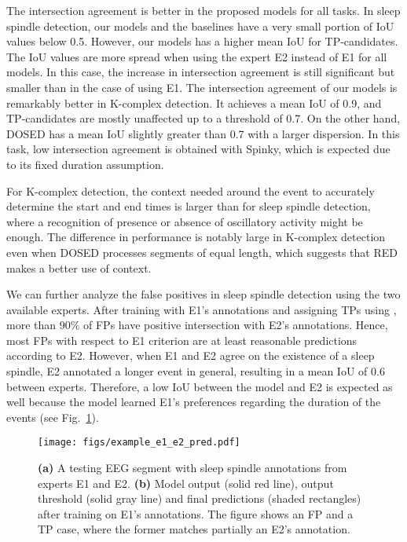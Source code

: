 \documentclass[conference]{IEEEtran}
\begin{document}
The intersection agreement is better in the proposed models for all tasks. In sleep spindle detection, our models and the baselines have a very small portion of IoU values below 0.5. However, our models has a higher mean IoU for TP-candidates. The IoU values are more spread when using the expert E2 instead of E1 for all models. In this case, the increase in intersection agreement is still significant but smaller than in the case of using E1. The intersection agreement of our models is remarkably better in K-complex detection. It achieves a mean IoU of 0.9, and TP-candidates are mostly unaffected up to a threshold of 0.7. On the other hand, DOSED has a mean IoU slightly greater than 0.7 with a larger dispersion. In this task, low intersection agreement is obtained with Spinky, which is expected due to its fixed duration assumption.

For K-complex detection, the context needed around the event to accurately determine the start and end times is larger than for sleep spindle detection, where a recognition of presence or absence of oscillatory activity might be enough. The difference in performance is notably large in K-complex detection even when DOSED processes segments of equal length, which suggests that RED makes a better use of context.

We can further analyze the false positives in sleep spindle detection using the two available experts. After training with E1's annotations and assigning TPs using , more than 90\% of FPs have positive intersection with E2's annotations. Hence, most FPs with respect to E1 criterion are at least reasonable predictions according to E2. However, when E1 and E2 agree on the existence of a sleep spindle, E2 annotated a longer event in general, resulting in a mean IoU of 0.6 between experts. Therefore, a low IoU between the model and E2 is expected as well because the model learned E1's preferences regarding the duration of the events (see Fig.~\ref{fig:example_e1_e2_pred}).

\begin{figure}[tbp]
\centering \texttt{[image: figs/example\_e1\_e2\_pred.pdf]}
\caption{
\textbf{(a)} A testing EEG segment with sleep spindle annotations from experts E1 and E2. \textbf{(b)} Model output (solid red line), output threshold (solid gray line) and final predictions (shaded rectangles) after training on E1's annotations. The figure shows an FP and a TP case, where the former matches partially an E2's annotation.
}
\label{fig:example_e1_e2_pred}
\end{figure}
\end{document}
